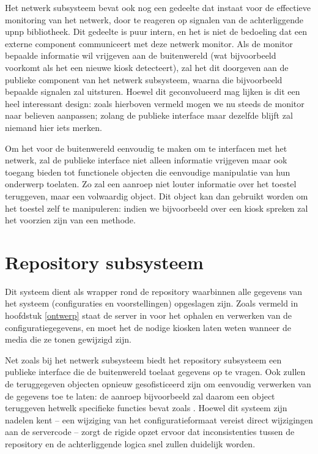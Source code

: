 Het netwerk subsysteem bevat ook nog een gedeelte dat instaat voor de effectieve monitoring van het netwerk, door te reageren op signalen van de achterliggende \ac{upnp} bibliotheek. Dit gedeelte is puur intern, en het is niet de bedoeling dat een externe component communiceert met deze netwerk monitor. Als de monitor bepaalde informatie wil vrijgeven aan de buitenwereld (wat bijvoorbeeld voorkomt als het een nieuwe kiosk detecteert), zal het dit doorgeven aan de publieke component van het netwerk subsysteem, waarna die bijvoorbeeld bepaalde signalen zal uitsturen. Hoewel dit geconvolueerd mag lijken is dit een heel interessant design: zoals hierboven vermeld mogen we nu steeds de monitor naar believen aanpassen; zolang de publieke interface maar dezelfde blijft zal niemand hier iets merken.

Om het voor de buitenwereld eenvoudig te maken om te interfacen met het netwerk, zal de publieke interface niet alleen informatie vrijgeven maar ook toegang bieden tot functionele objecten die eenvoudige manipulatie van hun onderwerp toelaten. Zo zal een  aanroep niet louter informatie over het toestel teruggeven, maar een volwaardig  object. Dit object kan dan gebruikt worden om het toestel zelf te manipuleren: indien we bijvoorbeeld over een kiosk spreken zal het voorzien zijn van een  methode.

\section{Repository subsysteem}
\label{server:structuur:repository}

Dit systeem dient als wrapper rond de repository waarbinnen alle gegevens van het systeem (configuraties en voorstellingen) opgeslagen zijn. Zoals vermeld in hoofdstuk \ref{ontwerp} staat de server in voor het ophalen en verwerken van de configuratiegegevens, en moet het de nodige kiosken laten weten wanneer de media die ze tonen gewijzigd zijn.

Net zoals bij het netwerk subsysteem biedt het repository subsysteem een publieke interface die de buitenwereld toelaat gegevens op te vragen. Ook zullen de teruggegeven objecten opnieuw gesofisticeerd zijn om eenvoudig verwerken van de gegevens toe te laten: de  aanroep bijvoorbeeld zal daarom een  object teruggeven hetwelk specifieke functies bevat zoals . Hoewel dit systeem zijn nadelen kent -- een wijziging van het configuratieformaat vereist direct wijzigingen aan de servercode -- zorgt de rigide opzet ervoor dat inconsistenties tussen de repository en de achterliggende logica snel zullen duidelijk worden. 

